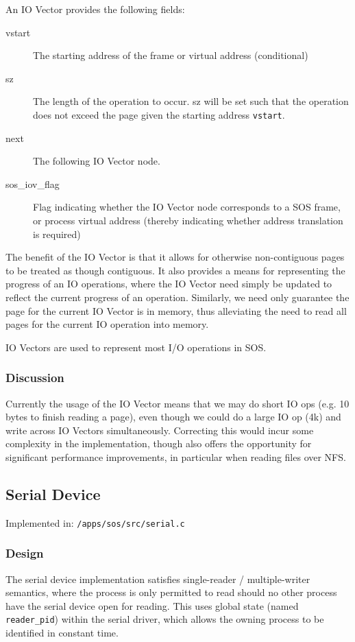 \documentclass[a4paper,12pt]{article}
\begin{document}
An IO Vector provides the following fields:
\begin{description}
\item[vstart] The starting address of the frame or virtual address (conditional)
\item[sz] The length of the operation to occur.  sz will be set such that the
  operation does not exceed the page given the starting address \texttt{vstart}.
\item[next] The following IO Vector node.
\item[sos\_iov\_flag] Flag indicating whether the IO Vector node corresponds to
  a SOS frame, or process virtual address (thereby indicating whether
  address translation is required)
\end{description}

The benefit of the IO Vector is that it allows for otherwise non-contiguous
pages to be treated as though contiguous.  It also provides a means for
representing the progress of an IO operations, where the IO Vector need simply
be updated to reflect the current progress of an operation.  Similarly, we
need only guarantee the page for the current IO Vector is in memory, thus
alleviating the need to read all pages for the current IO operation into
memory.

IO Vectors are used to represent most I/O operations in SOS.

\subsubsection{Discussion}
Currently the usage of the IO Vector means that we may do short IO ops
(e.g. 10 bytes to finish reading a page), even though we could do a large IO
op (4k) and write across IO Vectors simultaneously.  Correcting this would
incur some complexity in the implementation, though also offers the
opportunity for significant performance improvements, in particular when
reading files over NFS.

\subsection{Serial Device}
Implemented in: \texttt{/apps/sos/src/serial.c}

\subsubsection{Design}
The serial device implementation satisfies single-reader / multiple-writer
semantics, where the process is only permitted to read should no other process
have the serial device open for reading.  This uses global state (named
\texttt{reader\_pid}) within the serial driver, which allows the owning process to be
identified in constant time.
\end{document}
